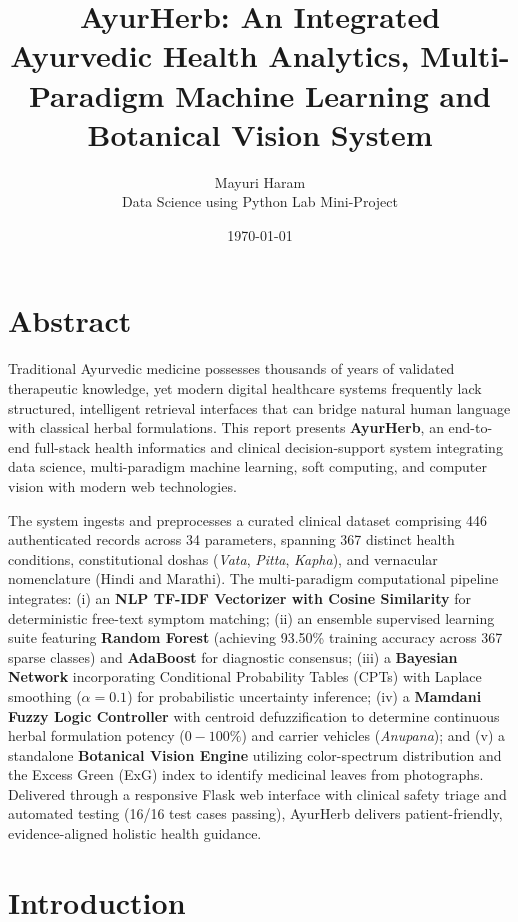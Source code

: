 \documentclass[12pt,a4paper]{article}
\title{\textbf{AyurHerb: An Integrated Ayurvedic Health Analytics, Multi-Paradigm Machine Learning and Botanical Vision System}}
\author{Mayuri Haram \\ Data Science using Python Lab Mini-Project}
\date{\today}
\begin{document}
\maketitle
\newpage

\tableofcontents
\newpage

\section{Abstract}

Traditional Ayurvedic medicine possesses thousands of years of validated therapeutic knowledge, yet modern digital healthcare systems frequently lack structured, intelligent retrieval interfaces that can bridge natural human language with classical herbal formulations. This report presents \textbf{AyurHerb}, an end-to-end full-stack health informatics and clinical decision-support system integrating data science, multi-paradigm machine learning, soft computing, and computer vision with modern web technologies.

The system ingests and preprocesses a curated clinical dataset comprising 446 authenticated records across 34 parameters, spanning 367 distinct health conditions, constitutional doshas (\textit{Vata}, \textit{Pitta}, \textit{Kapha}), and vernacular nomenclature (Hindi and Marathi). The multi-paradigm computational pipeline integrates: (i) an \textbf{NLP TF-IDF Vectorizer with Cosine Similarity} for deterministic free-text symptom matching; (ii) an ensemble supervised learning suite featuring \textbf{Random Forest} (achieving 93.50\% training accuracy across 367 sparse classes) and \textbf{AdaBoost} for diagnostic consensus; (iii) a \textbf{Bayesian Network} incorporating Conditional Probability Tables (CPTs) with Laplace smoothing ($\alpha=0.1$) for probabilistic uncertainty inference; (iv) a \textbf{Mamdani Fuzzy Logic Controller} with centroid defuzzification to determine continuous herbal formulation potency ($0-100\%$) and carrier vehicles (\textit{Anupana}); and (v) a standalone \textbf{Botanical Vision Engine} utilizing color-spectrum distribution and the Excess Green (ExG) index to identify medicinal leaves from photographs. Delivered through a responsive Flask web interface with clinical safety triage and automated testing (16/16 test cases passing), AyurHerb delivers patient-friendly, evidence-aligned holistic health guidance.

\section{Introduction}
\end{document}
